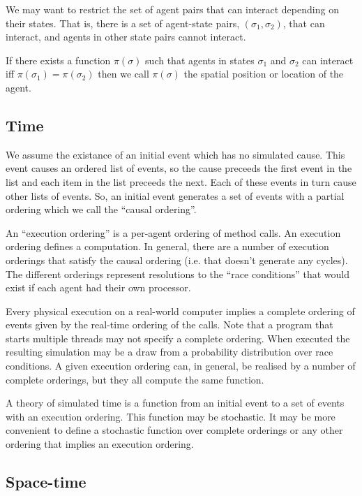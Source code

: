 \documentclass[a4paper]{article}
\begin{document}
We may want to restrict the set of agent pairs that can interact depending on their states. That is, there is a set of agent-state pairs, $(\sigma_1, \sigma_2)$, that can interact, and agents in other state pairs cannot interact.

If there exists a function $\pi(\sigma)$ such that agents in states $\sigma_1$ and $\sigma_2$ can interact iff $\pi(\sigma_1) = \pi(\sigma_2)$ then we call $\pi(\sigma)$ the spatial position or location of the agent.

\subsection{Time}

We assume the existance of an initial event which has no simulated cause. This event causes an ordered list of events, so the cause preceeds the first event in the list and each item in the list preceeds the next. Each of these events in turn cause other lists of events. So, an initial event generates a set of events with a partial ordering which we call the ``causal ordering''.

An ``execution ordering'' is a per-agent ordering of method calls. An execution ordering defines a computation. In general, there are a number of execution orderings that satisfy the causal ordering (i.e. that doesn't generate any cycles). The different orderings represent resolutions to the ``race conditions'' that would exist if each agent had their own processor.

Every physical execution on a real-world computer implies a complete ordering of events given by the real-time ordering of the calls. Note that a program that starts multiple threads may not specify a complete ordering. When executed the resulting simulation may be a draw from a probability distribution over race conditions. A given execution ordering can, in general, be realised by a number of complete orderings, but they all compute the same function.

A theory of simulated time is a function from an initial event to a set of events with an execution ordering. This function may be stochastic. It may be more convenient to define a stochastic function over complete orderings or any other ordering that implies an execution ordering.

\subsection{Space-time}
\end{document}
